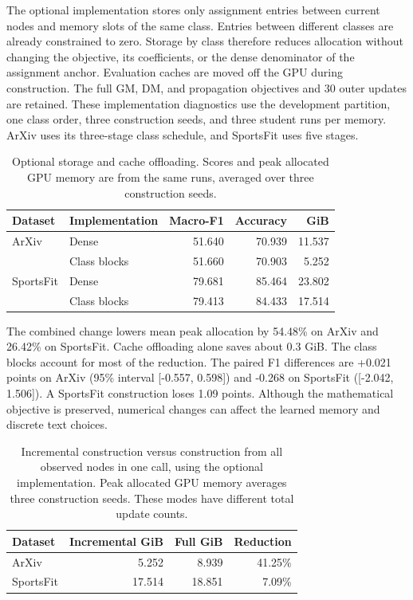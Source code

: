 The optional implementation stores only assignment entries between
current nodes and memory slots of the same class. Entries between
different classes are already constrained to zero. Storage by class
therefore reduces allocation without changing the objective, its
coefficients, or the dense denominator of the assignment anchor.
Evaluation caches are moved off the GPU during construction. The full
GM, DM, and propagation objectives and 30 outer updates are retained.
These implementation diagnostics use the development partition, one class
order, three construction seeds, and three student runs per memory.
ArXiv uses its three-stage class schedule, and SportsFit uses five stages.

\begin{table}[H]
\centering
\footnotesize
\setlength{\tabcolsep}{3pt}
\caption{Optional storage and cache offloading. Scores and peak allocated
GPU memory are from the same runs, averaged over three construction seeds.}
\label{tab:optional_storage}
\begin{tabular*}{\linewidth}{@{\extracolsep{\fill}}llrrr@{}}
\toprule
Dataset & Implementation & Macro-F1 & Accuracy & GiB\\
\midrule
ArXiv & Dense & 51.640 & 70.939 & 11.537\\
& Class blocks & 51.660 & 70.903 & 5.252\\
SportsFit & Dense & 79.681 & 85.464 & 23.802\\
& Class blocks & 79.413 & 84.433 & 17.514\\
\bottomrule
\end{tabular*}
\end{table}

The combined change lowers mean peak allocation by 54.48\% on ArXiv
and 26.42\% on SportsFit. Cache offloading alone saves about 0.3 GiB.
The class blocks account for most of the reduction. The paired F1
differences are +0.021 points on ArXiv (95\% interval [-0.557, 0.598])
and -0.268 on SportsFit ([-2.042, 1.506]). A SportsFit construction loses
1.09 points. Although the mathematical objective is preserved, numerical
changes can affect the learned memory and discrete text choices.

\begin{table}[H]
\centering
\footnotesize
\setlength{\tabcolsep}{3pt}
\caption{Incremental construction versus construction from all observed
nodes in one call, using the optional implementation. Peak allocated GPU
memory averages three construction seeds. These modes have different total update counts.}
\label{tab:construction_history}
\begin{tabular*}{\linewidth}{@{\extracolsep{\fill}}lrrr@{}}
\toprule
Dataset & Incremental GiB & Full GiB & Reduction\\
\midrule
ArXiv & 5.252 & 8.939 & 41.25\%\\
SportsFit & 17.514 & 18.851 & 7.09\%\\
\bottomrule
\end{tabular*}
\end{table}

